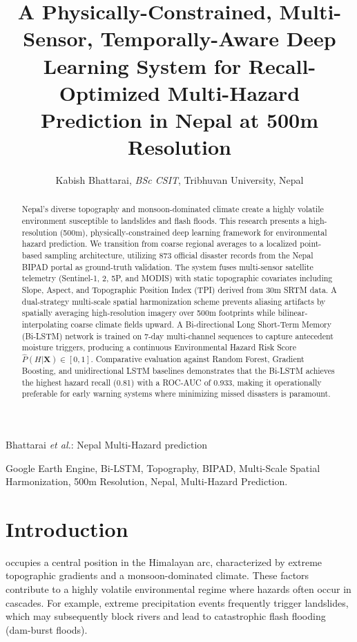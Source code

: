 \documentclass[journal,twoside]{IEEEtran}
\begin{document}
\title{A Physically-Constrained, Multi-Sensor, Temporally-Aware Deep Learning System for Recall-Optimized Multi-Hazard Prediction in Nepal at 500m Resolution}

\author{Kabish Bhattarai, \textit{BSc CSIT}, Tribhuvan University, Nepal}

%
{Bhattarai \MakeLowercase{\textit{et al.}}: Nepal Multi-Hazard prediction}

\maketitle

\begin{abstract}
Nepal's diverse topography and monsoon-dominated climate create a highly volatile environment susceptible to landslides and flash floods. This research presents a high-resolution (500m), physically-constrained deep learning framework for environmental hazard prediction. We transition from coarse regional averages to a localized point-based sampling architecture, utilizing 873 official disaster records from the Nepal BIPAD portal as ground-truth validation. The system fuses multi-sensor satellite telemetry (Sentinel-1, 2, 5P, and MODIS) with static topographic covariates including Slope, Aspect, and Topographic Position Index (TPI) derived from 30m SRTM data. A dual-strategy multi-scale spatial harmonization scheme prevents aliasing artifacts by spatially averaging high-resolution imagery over 500m footprints while bilinear-interpolating coarse climate fields upward. A Bi-directional Long Short-Term Memory (Bi-LSTM) network is trained on 7-day multi-channel sequences to capture antecedent moisture triggers, producing a continuous Environmental Hazard Risk Score $\hat{P}(H | \mathbf{X}) \in [0,1]$. Comparative evaluation against Random Forest, Gradient Boosting, and unidirectional LSTM baselines demonstrates that the Bi-LSTM achieves the highest hazard recall (0.81) with a ROC-AUC of 0.933, making it operationally preferable for early warning systems where minimizing missed disasters is paramount.
\end{abstract}

\begin{IEEEkeywords}
Google Earth Engine, Bi-LSTM, Topography, BIPAD, Multi-Scale Spatial Harmonization, 500m Resolution, Nepal, Multi-Hazard Prediction.
\end{IEEEkeywords}

\section{Introduction}
 occupies a central position in the Himalayan arc, characterized by extreme topographic gradients and a monsoon-dominated climate. These factors contribute to a highly volatile environmental regime where hazards often occur in cascades. For example, extreme precipitation events frequently trigger landslides, which may subsequently block rivers and lead to catastrophic flash flooding (dam-burst floods).
\end{document}
